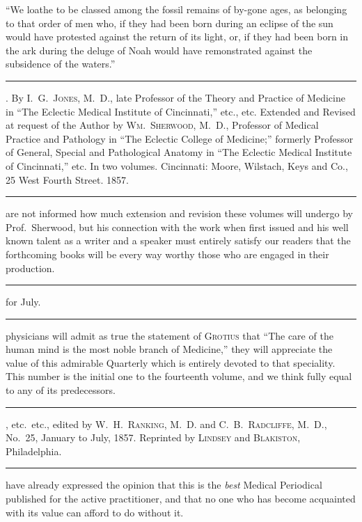 
``We loathe to be classed among the fossil remains of by-gone ages,
as belonging to that order of men who, if they had been born during
an eclipse of the sun would have protested against the return of its
light, or, if they had been born in the ark during the deluge of Noah
would have remonstrated against the subsidence of the waters.''

\fancybreak{* * *}
\footnotesize
{}. By I.~G.\ \textsc{Jones}, M.~D., late Professor of the
Theory and Practice of Medicine in ``The Eclectic Medical Institute of Cincinnati,''
etc., etc. Extended and Revised at request of the Author by \textsc{Wm.\ Sherwood}, M.~D.,
Professor of Medical Practice and Pathology in ``The Eclectic College of Medicine;''
formerly Professor of General, Special and Pathological Anatomy in ``The Eclectic
Medical Institute of Cincinnati,'' etc. In two volumes. Cincinnati: Moore, Wilstach,
Keys and Co., 25 West Fourth Street. 1857.
\plainbreak{1}
\normalsize

 are not informed how much extension and revision these volumes
will undergo by Prof.\ Sherwood, but his connection with the work when
first issued and his well known talent as a writer and a speaker must
entirely satisfy our readers that the forthcoming books will be every
way worthy those who are engaged in their production.

\fancybreak{* * *}
\footnotesize
{} for July.
\plainbreak{1}
\normalsize

 physicians will admit as true the statement of \textsc{Grotius} that ``The
care of the human mind is the most noble branch of Medicine,'' they
will appreciate the value of this admirable Quarterly which is entirely
devoted to that speciality. This number is the initial one to the fourteenth
volume, and we think fully equal to any of its predecessors.

\fancybreak{* * *}
\footnotesize
{}, etc.\ etc., edited by \textsc{W.~H.\ Ranking, M.~D.}
and \textsc{C.~B.\ Radcliffe, M.~D.}, No.\ 25, January to July, 1857. Reprinted by \textsc{Lindsey} and
\textsc{Blakiston}, Philadelphia.
\plainbreak{1}
\normalsize

 have already expressed the opinion that this is the \emph{best} Medical
Periodical published for the active practitioner, and that no one who
has become acquainted with its value can afford to do without it.

